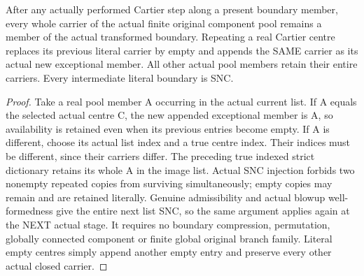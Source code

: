 \begin{lemma}
\label{hir:general-nc-completion-literal-component-history}
\leanok
After any actually performed Cartier step along a present boundary member,
every whole carrier of the actual finite original component pool remains a
member of the actual transformed boundary. Repeating a real Cartier centre
replaces its previous literal carrier by empty and appends the SAME carrier
as its actual new exceptional member. All other actual pool members retain
their entire carriers. Every intermediate literal boundary is SNC.
\end{lemma}
\begin{proof}
Take a real pool member A occurring in the actual current list. If A equals
the selected actual centre C, the new appended exceptional member is A, so
availability is retained even when its previous entries become empty. If A
is different, choose its actual list index and a true centre index. Their
indices must be different, since their carriers differ. The preceding true
indexed strict dictionary retains its whole A in the image list. Actual SNC
injection forbids two nonempty repeated copies from surviving simultaneously;
empty copies may remain and are retained literally. Genuine admissibility
and actual blowup well-formedness give the entire next list SNC, so the same
argument applies again at the NEXT actual stage. It requires no boundary
compression, permutation, globally connected component or finite global
original branch family. Literal empty centres simply append another empty
entry and preserve every other actual closed carrier.
\end{proof}

